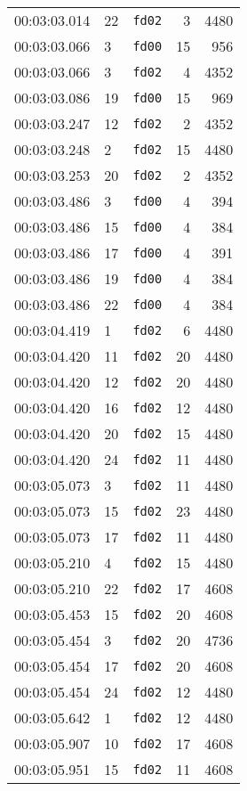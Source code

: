 \documentclass{article}
\begin{document}
\begin{longtable}{lllrr}
00:03:03.014 & 22 & \texttt{fd02} & 3 & 4480 \\
00:03:03.066 & 3 & \texttt{fd00} & 15 & 956 \\
00:03:03.066 & 3 & \texttt{fd02} & 4 & 4352 \\
00:03:03.086 & 19 & \texttt{fd00} & 15 & 969 \\
00:03:03.247 & 12 & \texttt{fd02} & 2 & 4352 \\
00:03:03.248 & 2 & \texttt{fd02} & 15 & 4480 \\
00:03:03.253 & 20 & \texttt{fd02} & 2 & 4352 \\
00:03:03.486 & 3 & \texttt{fd00} & 4 & 394 \\
00:03:03.486 & 15 & \texttt{fd00} & 4 & 384 \\
00:03:03.486 & 17 & \texttt{fd00} & 4 & 391 \\
00:03:03.486 & 19 & \texttt{fd00} & 4 & 384 \\
00:03:03.486 & 22 & \texttt{fd00} & 4 & 384 \\
00:03:04.419 & 1 & \texttt{fd02} & 6 & 4480 \\
00:03:04.420 & 11 & \texttt{fd02} & 20 & 4480 \\
00:03:04.420 & 12 & \texttt{fd02} & 20 & 4480 \\
00:03:04.420 & 16 & \texttt{fd02} & 12 & 4480 \\
00:03:04.420 & 20 & \texttt{fd02} & 15 & 4480 \\
00:03:04.420 & 24 & \texttt{fd02} & 11 & 4480 \\
00:03:05.073 & 3 & \texttt{fd02} & 11 & 4480 \\
00:03:05.073 & 15 & \texttt{fd02} & 23 & 4480 \\
00:03:05.073 & 17 & \texttt{fd02} & 11 & 4480 \\
00:03:05.210 & 4 & \texttt{fd02} & 15 & 4480 \\
00:03:05.210 & 22 & \texttt{fd02} & 17 & 4608 \\
00:03:05.453 & 15 & \texttt{fd02} & 20 & 4608 \\
00:03:05.454 & 3 & \texttt{fd02} & 20 & 4736 \\
00:03:05.454 & 17 & \texttt{fd02} & 20 & 4608 \\
00:03:05.454 & 24 & \texttt{fd02} & 12 & 4480 \\
00:03:05.642 & 1 & \texttt{fd02} & 12 & 4480 \\
00:03:05.907 & 10 & \texttt{fd02} & 17 & 4608 \\
00:03:05.951 & 15 & \texttt{fd02} & 11 & 4608 \\

\end{longtable}
\end{document}
